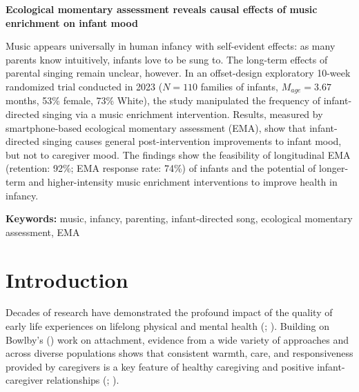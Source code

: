 \documentclass[
]{article}
\author{}
\date{\vspace{-2.5em}}
\begin{document}
\raggedright
\LARGE

\textbf{Ecological momentary assessment reveals causal effects of music enrichment on infant mood}

\vspace{0.1in}

\bigskip

\normalsize
\begin{mdframed}[backgroundcolor=gray!20]
Music appears universally in human infancy with self-evident effects: as many parents know intuitively, infants love to be sung to. The long-term effects of parental singing remain unclear, however. In an offset-design exploratory 10-week randomized trial conducted in 2023 ($N = 110$ families of infants, $M_{age} = 3.67$ months, 53\% female, 73\% White), the study manipulated the frequency of infant-directed singing via a music enrichment intervention. Results, measured by smartphone-based ecological momentary assessment (EMA), show that infant-directed singing causes general post-intervention improvements to infant mood, but not to caregiver mood. The findings show the feasibility of longitudinal EMA (retention: 92\%; EMA response rate: 74\%) of infants and the potential of longer-term and higher-intensity music enrichment interventions to improve health in infancy.

\textbf{Keywords:} music, infancy, parenting, infant-directed song, ecological momentary assessment, EMA
\end{mdframed}

\linenumbers
\bigskip

\section{Introduction}\label{introduction}

Decades of research have demonstrated the profound impact of the quality
of early life experiences on lifelong physical and mental health
(;
). Building on
Bowlby's () work on attachment, evidence
from a wide variety of approaches and across diverse populations shows
that consistent warmth, care, and responsiveness provided by caregivers
is a key feature of healthy caregiving and positive infant-caregiver
relationships (;
).
\end{document}
